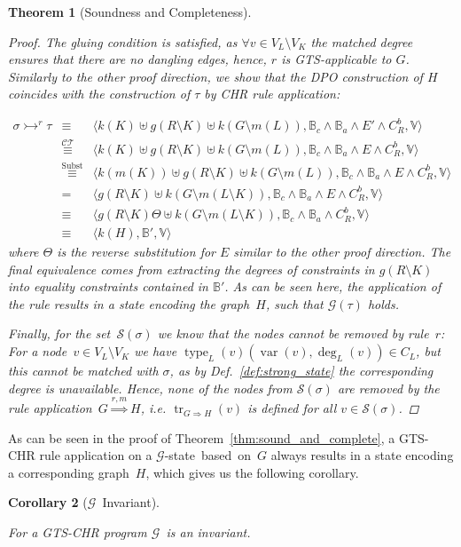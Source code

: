 \documentclass{tlp}
\newtheorem{theorem}{Theorem}\newtheorem{corollary}[theorem]{Corollary}
\newcommand{\st}[3]{\ensuremath{\langle #1 , #2 , #3 \rangle}}
\newcommand{\CT}{\ensuremath{\mathcal{CT}}}
\newcommand{\mcG}{\ensuremath{\mathcal{G}}}
\newcommand{\bbB}{\ensuremath{\mathbb{B}}}
\newcommand{\bbBca}{\ensuremath{\bbB_c \land \bbB_a}}
\newcommand{\bbV}{\ensuremath{\mathbb{V}}}
\newcommand{\der}{\ensuremath{\rightarrowtail}}
\newcommand{\dergts}{\ensuremath{\Rightarrow}}
\DeclareMathOperator{\var}{var}
\DeclareMathOperator{\type}{type}
\DeclareMathOperator{\track}{tr}
\newcommand{\eqct}{\ensuremath{\stackrel{\CT}{\equiv}}}
\newcommand{\eqsubst}{\ensuremath{\stackrel{\text{Subst}}{\equiv}}}
\newcommand{\strong}{\ensuremath{\mathcal{S}}}
\begin{document}
\begin{theorem}[Soundness and Completeness]
\begin{proof}
The gluing condition is satisfied, as $\forall v \in V_L \setminus V_K$ the
matched degree ensures that there are no dangling edges, hence, $r$ is
GTS-applicable to $G$. Similarly to the other proof direction, we show that the
DPO construction of $H$ coincides with the construction of $\tau$ by CHR rule
application:

\[\begin{array}{lcl} \sigma \der^r \tau & \equiv & \st{k(K) \uplus g(R \setminus
K) \uplus k(G
\setminus m(L))}{\bbBca \land E' \land C_R^b}{\bbV}\\
& \eqct & \st{k(K) \uplus g(R \setminus K) \uplus k(G
\setminus m(L))}{\bbBca \land E \land C_R^b}{\bbV}\\
& \eqsubst & \st{k(m(K)) \uplus g(R \setminus K) \uplus k(G
\setminus m(L))}{\bbBca \land E \land C_R^b}{\bbV}\\
& = & \st{g(R \setminus K) \uplus k(G \setminus m(L \setminus K))}{\bbBca \land
E \land C_R^b}{\bbV} \\
& \equiv & \st{g(R \setminus K) \Theta \uplus k(G \setminus m(L \setminus
K))}{\bbBca \land C_R^b}{\bbV}\\
& \equiv & \st{k(H)}{\bbB'}{\bbV}
  \end{array}
\] where $\Theta$ is the reverse substitution for $E$ similar to the other proof
direction. The final equivalence comes from extracting the degrees of constraints
in $g(R \setminus K)$ into equality constraints contained in $\bbB'$. As can be
seen here, the application of the rule results in a state encoding the graph~$H$,
such that $\mcG(\tau)$ holds.

Finally, for the set~$\strong(\sigma)$ we know that the nodes cannot be removed
by rule~$r$: For a node~$v\in V_L\setminus V_K$ we have
$\type_L(v)(\var(v),\deg_L(v)) \in C_L$, but this cannot be matched with
$\sigma$, as by Def.~\ref{def:strong_state} the corresponding degree is
unavailable. Hence, none of the nodes from $\strong(\sigma)$ are removed by the
rule application~$G \stackrel{r,m}{\Longrightarrow} H$, i.e. $\track_{G
\dergts H}(v)$ is defined for all $v \in \strong(\sigma)$.
\end{proof}
\end{theorem}

As can be seen in the proof of Theorem~\ref{thm:sound_and_complete}, a GTS-CHR
rule application on a \mcG-state~based~on~$G$ always results in a state encoding
a corresponding graph~$H$, which gives us the following corollary.

\begin{corollary}[\mcG\ Invariant]\label{cor:g_invariant}

For a GTS-CHR program \mcG\ is an invariant.
\end{corollary}
\end{document}
